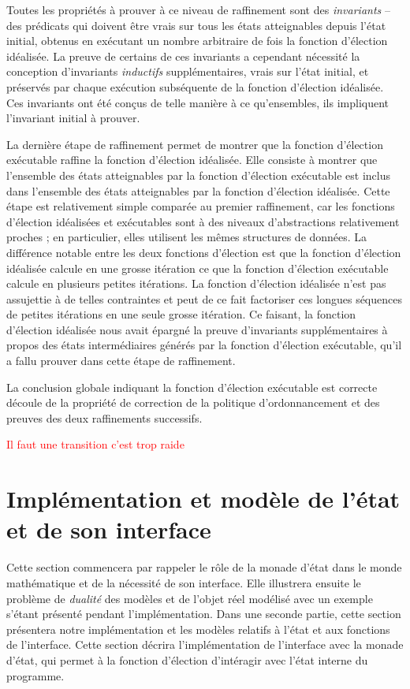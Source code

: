 	Toutes les propriétés à prouver à ce niveau de raffinement sont des \emph{invariants} -- des prédicats qui doivent être vrais sur tous les états atteignables depuis l'état initial, obtenus en exécutant un nombre arbitraire de fois la fonction d'élection idéalisée. La preuve de certains de ces invariants a cependant nécessité la conception d'invariants \emph{inductifs} supplémentaires, vrais sur l'état initial, et préservés par chaque exécution subséquente de la fonction d'élection idéalisée. Ces invariants ont été conçus de telle manière à ce qu'ensembles, ils impliquent l'invariant initial à prouver.

	La dernière étape de raffinement permet de montrer que la fonction d'élection exécutable raffine la fonction d'élection idéalisée. Elle consiste à montrer que l'ensemble des états atteignables par la fonction d'élection exécutable est inclus dans l'ensemble des états atteignables par la fonction d'élection idéalisée. Cette étape est relativement simple comparée au premier raffinement, car les fonctions d'élection idéalisées et exécutables sont à des niveaux d'abstractions relativement proches ; en particulier, elles utilisent les mêmes structures de données.
	La différence notable entre les deux fonctions d'élection est que la fonction d'élection idéalisée calcule en une grosse itération ce que la fonction d'élection exécutable calcule en plusieurs petites itérations. La fonction d'élection idéalisée n'est pas assujettie à de telles contraintes et peut de ce fait factoriser ces longues séquences de petites itérations en une seule grosse itération. Ce faisant, la fonction d'élection idéalisée nous avait épargné la preuve d'invariants supplémentaires à propos des états intermédiaires générés par la fonction d'élection exécutable, qu'il a fallu prouver dans cette étape de raffinement.

	La conclusion globale indiquant la fonction d'élection exécutable est correcte découle de la propriété de correction de la politique d'ordonnancement et des preuves des deux raffinements successifs.

	\textcolor{red}{Il faut une transition c'est trop raide}

	\section{Implémentation et modèle de l'état et de son interface}

	Cette section commencera par rappeler le rôle de la monade d'état dans le monde mathématique et de la nécessité de son interface. Elle illustrera ensuite le problème de \emph{dualité} des modèles et de l'objet réel modélisé avec un exemple s'étant présenté pendant l'implémentation.
	Dans une seconde partie, cette section présentera notre implémentation et les modèles relatifs à l'état et aux fonctions de l'interface.
	Cette section décrira l'implémentation de l'interface avec la monade d'état, qui permet à la fonction d'élection d'intéragir avec l'état interne du programme.
